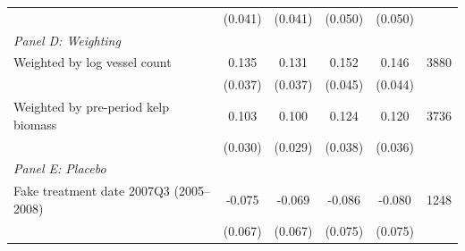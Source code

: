 \begin{tabular}{l*{4}{c}c}
 & (0.041) & (0.041) & (0.050) & (0.050) & \\
[0.4em]
\multicolumn{6}{l}{\emph{Panel D: Weighting}}\\
Weighted by log vessel count & 0.135\sym{***} & 0.131\sym{***} & 0.152\sym{***} & 0.146\sym{***} & 3880\\
 & (0.037) & (0.037) & (0.045) & (0.044) & \\
Weighted by pre-period kelp biomass & 0.103\sym{***} & 0.100\sym{***} & 0.124\sym{***} & 0.120\sym{***} & 3736\\
 & (0.030) & (0.029) & (0.038) & (0.036) & \\
[0.4em]
\multicolumn{6}{l}{\emph{Panel E: Placebo}}\\
Fake treatment date 2007Q3 (2005--2008) & -0.075\sym{} & -0.069\sym{} & -0.086\sym{} & -0.080\sym{} & 1248\\
 & (0.067) & (0.067) & (0.075) & (0.075) & \\
\hline\hline
\end{tabular}
